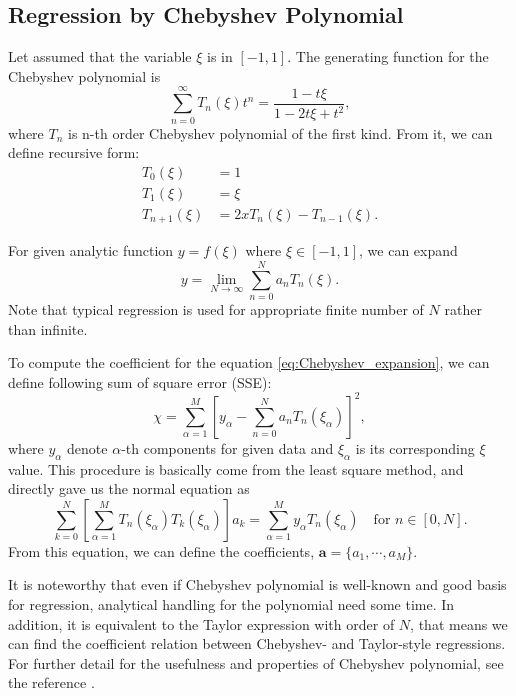 \documentclass[10pt, a4paper]{report}
\begin{document}
\begin{appendices}
  \section{Regression by Chebyshev Polynomial}
  Let assumed that the variable $\xi$ is in $[-1, 1]$.
  The generating function for the Chebyshev polynomial is
  \begin{equation}
    \sum_{n=0}^{\infty}T_n(\xi)t^n = \frac{1 - t\xi}{1 - 2t\xi + t^2},
  \end{equation}
  where $T_n$ is n-th order Chebyshev polynomial of the first kind. 
  From it, we can define recursive form:
  \begin{align}
    T_0(\xi) & = 1 \\
    T_1(\xi) & = \xi \\
    T_{n+1}(\xi) & = 2xT_n(\xi) - T_{n-1}(\xi).\label{eq:Chebyshev_recursion}
  \end{align}

  For given analytic function $y = f(\xi)$ where $\xi \in [-1, 1]$, we can expand
  \begin{equation}
    y = \lim_{N\to\infty}\sum_{n=0}^{N} a_nT_n(\xi).\label{eq:Chebyshev_expansion}
  \end{equation}
  Note that typical regression is used for appropriate finite number of $N$ rather than infinite. 

  To compute the coefficient for the equation \eqref{eq:Chebyshev_expansion}, we can define following sum of square error (SSE):
  \begin{equation}
    \chi = \sum_{\alpha=1}^{M} \left[y_\alpha - \sum_{n=0}^{N}a_nT_n(\xi_\alpha)\right]^2,
  \end{equation}
  where $y_\alpha$ denote $\alpha$-th components for given data and $\xi_\alpha$ is its corresponding $\xi$ value.
  This procedure is basically come from the least square method, and directly gave us the normal equation as
  \begin{equation}
    \sum_{k=0}^{N}\left[\sum_{\alpha=1}^{M}T_n(\xi_\alpha)T_k(\xi_\alpha)\right]a_k = \sum_{\alpha=1}^{M}y_{\alpha}T_n(\xi_\alpha)\quad\textrm{for } n\in [0, N].
  \end{equation}
  From this equation, we can define the coefficients, $\mathbf{a} = \{a_1,\cdots,a_M\}$.

  It is noteworthy that even if Chebyshev polynomial is well-known and good basis for regression, analytical handling for the polynomial need some time. In addition, it is equivalent to the Taylor expression with order of $N$, that means we can find the coefficient relation between Chebyshev- and Taylor-style regressions.
  For further detail for the usefulness and properties of Chebyshev polynomial, see the reference \textcite{arfken2008mathematical}.



\end{appendices}
\end{document}
